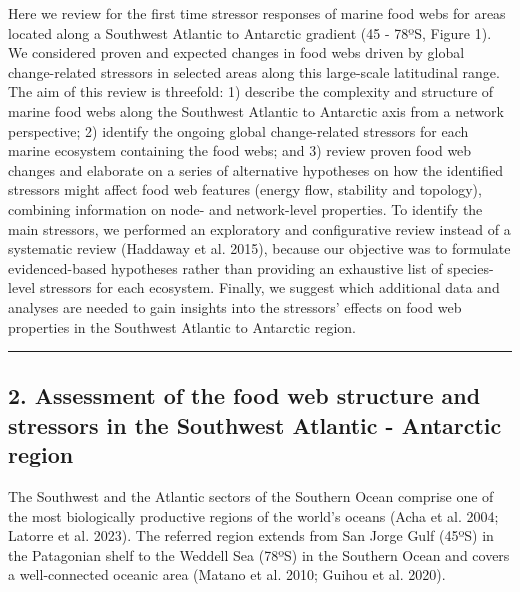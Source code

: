 \documentclass[
]{article}
\begin{document}
Here we review for the first time stressor responses of marine food webs
for areas located along a Southwest Atlantic to Antarctic gradient (45 -
78ºS, Figure 1). We considered proven and expected changes in food webs
driven by global change-related stressors in selected areas along this
large-scale latitudinal range. The aim of this review is threefold: 1)
describe the complexity and structure of marine food webs along the
Southwest Atlantic to Antarctic axis from a network perspective; 2)
identify the ongoing global change-related stressors for each marine
ecosystem containing the food webs; and 3) review proven food web
changes and elaborate on a series of alternative hypotheses on how the
identified stressors might affect food web features (energy flow,
stability and topology), combining information on node- and
network-level properties. To identify the main stressors, we performed
an exploratory and configurative review instead of a systematic review
(Haddaway et al. 2015), because our objective was to formulate
evidenced-based hypotheses rather than providing an exhaustive list of
species-level stressors for each ecosystem. Finally, we suggest which
additional data and analyses are needed to gain insights into the
stressors' effects on food web properties in the Southwest Atlantic to
Antarctic region.

\begin{center}\rule{0.5\linewidth}{0.5pt}\end{center}

\subsection{2. Assessment of the food web structure and stressors in the
Southwest Atlantic - Antarctic
region}\label{assessment-of-the-food-web-structure-and-stressors-in-the-southwest-atlantic---antarctic-region}

The Southwest and the Atlantic sectors of the Southern Ocean comprise
one of the most biologically productive regions of the world's oceans
(Acha et al. 2004; Latorre et al. 2023). The referred region extends
from San Jorge Gulf (45ºS) in the Patagonian shelf to the Weddell Sea
(78ºS) in the Southern Ocean and covers a well-connected oceanic area
(Matano et al. 2010; Guihou et al. 2020).
\end{document}
